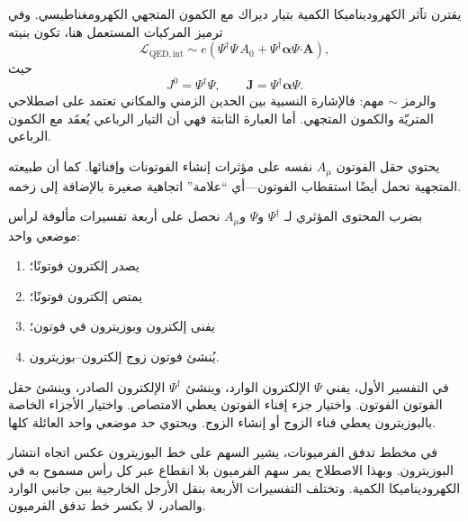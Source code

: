 يقترن تآثر الكهروديناميكا الكمية بتيار ديراك مع الكمون المتجهي الكهرومغناطيسي. وفي ترميز المركبات المستعمل هنا، تكون بنيته
\begin{equation}
\mathcal L_{\mathrm{QED,int}}
\sim
e\left(
\Psi^\dagger\Psi\,A_0
+
\Psi^\dagger\boldsymbol{\alpha}\Psi\mathbin{\boldsymbol{\cdot}}\mathbf A
\right),
\end{equation}
حيث
\begin{equation}
J^0=\Psi^\dagger\Psi,
\qquad
\mathbf J=\Psi^\dagger\boldsymbol{\alpha}\Psi.
\end{equation}
والرمز \(\sim\) مهم: فالإشارة النسبية بين الحدين الزمني والمكاني تعتمد على اصطلاحي المتريّة والكمون المتجهي. أما العبارة الثابتة فهي أن التيار الرباعي يُعقَد مع الكمون الرباعي.

يحتوي حقل الفوتون \(A_\mu\) نفسه على مؤثرات إنشاء الفوتونات وإفنائها. كما أن طبيعته المتجهية تحمل أيضًا استقطاب الفوتون---أي ``علامة'' اتجاهية صغيرة بالإضافة إلى زخمه.

\begin{classroomqa}
\end{classroomqa}

بضرب المحتوى المؤثري لـ \(\Psi^\dagger\) و\(\Psi\) و\(A_\mu\) نحصل على أربعة تفسيرات مألوفة لرأس موضعي واحد:
\begin{enumerate}
\item يصدر إلكترون فوتونًا؛
\item يمتص إلكترون فوتونًا؛
\item يفنى إلكترون وبوزيترون في فوتون؛
\item يُنشئ فوتون زوج إلكترون--بوزيترون.
\end{enumerate}
في التفسير الأول، يفني \(\Psi\) الإلكترون الوارد، وينشئ \(\Psi^\dagger\) الإلكترون الصادر، وينشئ حقل الفوتون الفوتون. واختيار جزء إفناء الفوتون يعطي الامتصاص. واختيار الأجزاء الخاصة بالبوزيترون يعطي فناء الزوج أو إنشاء الزوج. ويحتوي حد موضعي واحد العائلة كلها.

في مخطط تدفق الفرميونات، يشير السهم على خط البوزيترون عكس اتجاه انتشار البوزيترون. وبهذا الاصطلاح يمر سهم الفرميون بلا انقطاع عبر كل رأس مسموح به في الكهروديناميكا الكمية. وتختلف التفسيرات الأربعة بنقل الأرجل الخارجية بين جانبي الوارد والصادر، لا بكسر خط تدفق الفرميون.

